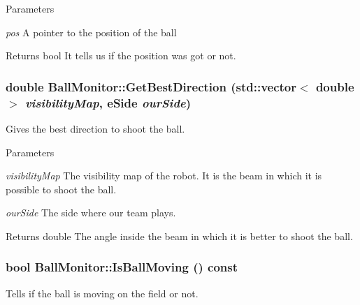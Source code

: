 \begin{DoxyParams}{Parameters}
\item[{\em pos}]A pointer to the position of the ball \end{DoxyParams}
\begin{DoxyReturn}{Returns}
bool It tells us if the position was got or not. 
\end{DoxyReturn}
\hypertarget{classBallMonitor_a9045d5d3abf9c9b549303c831b3387e0}{
\subsubsection[{GetBestDirection}]{\setlength{\rightskip}{0pt plus 5cm}double BallMonitor::GetBestDirection (std::vector$<$ double $>$ {\em visibilityMap}, \/  eSide {\em ourSide})}}
\label{classBallMonitor_a9045d5d3abf9c9b549303c831b3387e0}


Gives the best direction to shoot the ball. 


\begin{DoxyParams}{Parameters}
\item[{\em visibilityMap}]The visibility map of the robot. It is the beam in which it is possible to shoot the ball. \item[{\em ourSide}]The side where our team plays. \end{DoxyParams}
\begin{DoxyReturn}{Returns}
double The angle inside the beam in which it is better to shoot the ball. 
\end{DoxyReturn}
\hypertarget{classBallMonitor_a8995e71b82d80987984dd6b1ed89c0a0}{
\subsubsection[{IsBallMoving}]{\setlength{\rightskip}{0pt plus 5cm}bool BallMonitor::IsBallMoving () const}}
\label{classBallMonitor_a8995e71b82d80987984dd6b1ed89c0a0}


Tells if the ball is moving on the field or not. 

